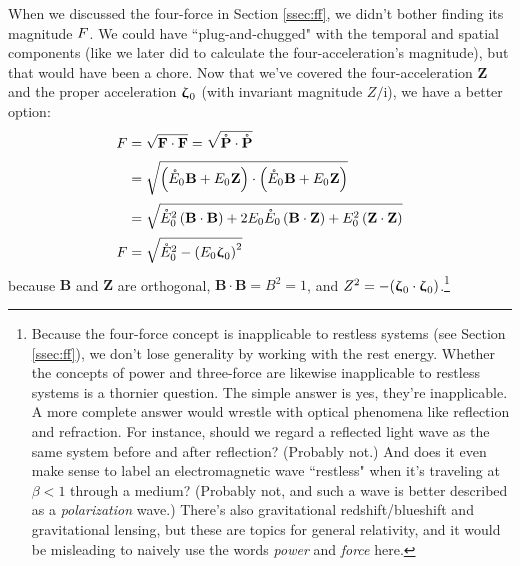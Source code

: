 \documentclass[12pt]{article}
\newcommand{\abs}[1]{\mathnormal \vv{#1}}
\renewcommand{\vv}[1]{\mathbf{#1}}
\newcommand{\vvzeta}{\bm{\upzeta}}
\begin{document}
When we discussed the four-force in Section \ref{ssec:ff}, we didn't bother finding its magnitude $\abs F$. We could have ``plug-and-chugged" with the temporal and spatial components (like we later did to calculate the four-acceleration's magnitude), but that would have been a chore. Now that we've covered the four-acceleration $\vv Z$ and the proper acceleration $\vvzeta_{\mkern1mu 0}$ (with invariant magnitude $Z/\mathrm{i}$), we have a better option:
\begin{equation}\label{eq:40}
\begin{split}
F &= \sqrt{\vv F \cdot \vv F} = \sqrt{\mathring{\vv P} \cdot \mathring{\vv P}} \\[2pt]
&= \sqrt{ \left( \mathring{E}_0 \mkern.5mu \vv B + E_0 \mkern.5mu \vv Z \right) \cdot \left( \mathring{E}_0 \mkern.5mu \vv B + E_0 \mkern.5mu \vv Z \right) }\\[2pt]
&= \sqrt{ \mathring{E}_0^2 \left( \vv B \cdot \vv B \right) + 2 E_0 \mathring{E}_0 \left( \vv B \cdot \vv Z \right) + E_0^2 \left( \vv Z \cdot \vv Z \right) } \\[2pt]
F &= \sqrt{ \mathring{E}_0^2 - \left( E_0 \vvzeta_{\mkern1mu 0} \right)^2 }
\end{split}
\end{equation}
because $\vv B$ and $\vv Z$ are orthogonal, $\vv B \cdot \vv B = B^2 = 1$, and $Z^2 = - (\vvzeta_{\mkern1mu 0} \cdot \vvzeta_{\mkern1mu 0})$.\footnote{Because the four-force concept is inapplicable to restless systems (see Section \ref{ssec:ff}), we don't lose generality by working with the rest energy. Whether the concepts of power and three-force are likewise inapplicable to restless systems is a thornier question. The simple answer is yes, they're inapplicable. A more complete answer would wrestle with optical phenomena like reflection and refraction. For instance, should we regard a reflected light wave as the same system before and after reflection? (Probably not.) And does it even make sense to label an electromagnetic wave ``restless" when it's traveling at $\beta < 1$ through a medium? (Probably not, and such a wave is better described as a \emph{polarization} wave.) There's also gravitational redshift/blueshift and gravitational lensing, but these are topics for general relativity, and it would be misleading to naively use the words \emph{power} and \emph{force} here.}
\end{document}
